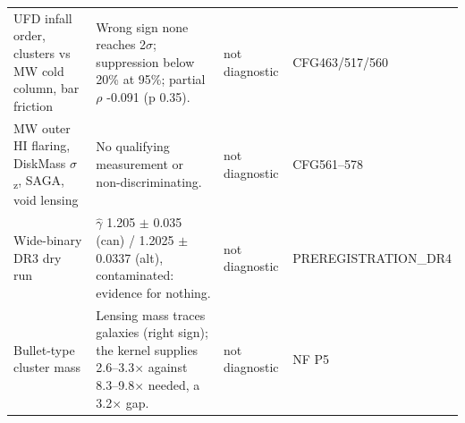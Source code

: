 \documentclass[10pt]{article}
\begin{document}
{\begin{longtable}{>{\raggedright\arraybackslash}p{4.4cm}>{\raggedright\arraybackslash}p{11.6cm}>{\raggedright\arraybackslash}p{2.0cm}>{\raggedright\arraybackslash}p{3.4cm}}
UFD infall order, clusters vs MW cold column, bar friction & Wrong sign none reaches 2\ensuremath{\sigma}; suppression below 20\% at 95\%; partial \ensuremath{\rho} -0.091 (p 0.35). & not diagnostic & CFG463/517/560 \\
MW outer HI flaring, DiskMass \ensuremath{\sigma}\textsubscript{z}, SAGA, void lensing & No qualifying measurement or non-discriminating. & not diagnostic & CFG561--578 \\
Wide-binary DR3 dry run & \ensuremath{\hat{\gamma}} 1.205 \ensuremath{\pm} 0.035 (can) / 1.2025 \ensuremath{\pm} 0.0337 (alt), contaminated: evidence for nothing. & not diagnostic & PREREGISTRATION\_DR4 \\
Bullet-type cluster mass & Lensing mass traces galaxies (right sign); the kernel supplies 2.6--3.3\ensuremath{\times} against 8.3--9.8\ensuremath{\times} needed, a 3.2\ensuremath{\times} gap. & not diagnostic & NF P5 \\
\bottomrule\end{longtable}}
\end{document}

